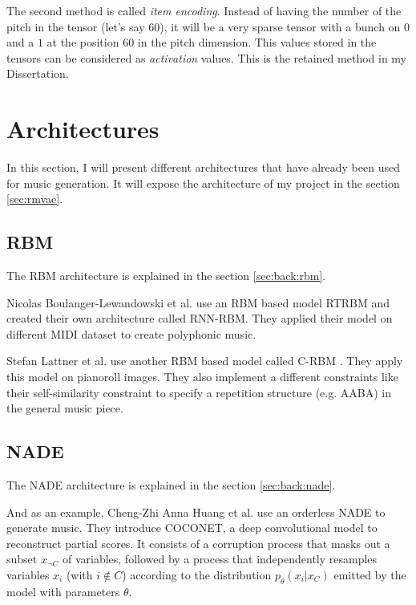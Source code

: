 \documentclass[12pt]{report}
\begin{document}
The second method is called \textit{item encoding}.
Instead of having the number of the pitch in the tensor (let's say $60$), it will be a very sparse tensor with a bunch on $0$ and a $1$ at the position $60$ in the pitch dimension.
This values stored in the tensors can be considered as \textit{activation} values.
This is the retained method in my Dissertation.


\section{Architectures}
\label{sec:related-works:architectures}


In this section, I will present different architectures that have already been used for music generation. It will expose the architecture of my project in the section \ref{sec:rmvae}.


\subsection{RBM}

The RBM architecture is explained in the section \ref{sec:back:rbm}.

Nicolas Boulanger-Lewandowski et al. \cite{boulanger-lewandowski_modeling_2012} use an RBM based model RTRBM \cite{sutskever_recurrent_nodate, mittelman_structured_nodate} and created their own architecture called RNN-RBM.
They applied their model on different MIDI dataset to create polyphonic music.

Stefan Lattner et al. \cite{lattner_imposing_2018} use another RBM based model called C-RBM \cite{norouzi_convolutional_nodate, norouzi_stacks_nodate}.
They apply this model on pianoroll images.
They also implement a different constraints like their self-similarity constraint to specify a repetition structure (e.g. AABA) in the general music piece.


\subsection{NADE}
\label{sec:rw:nade}

The NADE architecture is explained in the section \ref{sec:back:nade}.

And as an example, Cheng-Zhi Anna Huang et al. \cite{huang_counterpoint_2017} use an orderless NADE \cite{uria_deep_2014} to generate music. They introduce COCONET, a deep convolutional model to reconstruct partial scores.
It consists of a corruption process that masks out a subset $x_{\neg C}$ of variables, followed by a process that independently resamples variables $x_{i}$ (with $i \not \in C$) according to the distribution $p_{\theta} (x_i | x_C )$ emitted by the model with parameters $\theta$.
\end{document}
